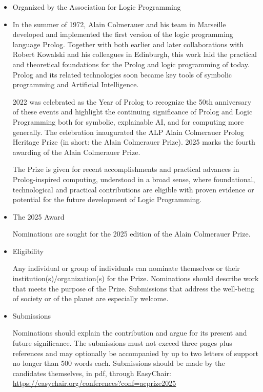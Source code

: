 \documentclass[prodmode,acmtecs]{acmsmall} %
\begin{document}
\begin{itemize}\item  Organized by the Association for Logic Programming 
 
\item  In the summer of 1972, Alain Colmerauer and his team in Marseille developed and implemented the first version of the logic programming language Prolog. Together with both earlier and later collaborations with Robert Kowalski and his colleagues in Edinburgh, this work laid the practical and theoretical foundations for the Prolog and logic programming of today. Prolog and its related technologies soon became key tools of symbolic programming and Artificial Intelligence. 
 
  2022 was celebrated as the Year of Prolog to recognize the 50th anniversary of these events and highlight the continuing significance of Prolog and Logic Programming both for symbolic, explainable AI, and for computing more generally. The celebration inaugurated the ALP Alain Colmerauer Prolog Heritage Prize (in short: the Alain Colmerauer Prize). 2025 marks the fourth awarding of the Alain Colmerauer Prize. 
 
  The Prize is given for recent accomplishments and practical advances in Prolog-inspired computing, understood in a broad sense, where foundational, technological and practical contributions are eligible with proven evidence or potential for the future development of Logic Programming. 
 
\item  The 2025 Award 
 
  Nominations are sought for the 2025 edition of the Alain Colmerauer Prize. 
 
\item  Eligibility 
 
  Any individual or group of individuals can nominate themselves or their institution(s)/organization(s) for the Prize. Nominations should describe work that meets the purpose of the Prize. Submissions that address the well-being of society or of the planet are especially welcome. 
 
\item  Submissions 
 
  Nominations should explain the contribution and argue for its present and future significance. The submissions must not exceed three pages plus references and may optionally be accompanied by up to two letters of support no longer than 500 words each. Submissions should be made by the candidates themselves, in pdf, through EasyChair: \href{https://easychair.org/conferences?conf=acprize2025}{https://easychair.org/conferences?conf=acprize2025} 
 

\end{itemize}
\end{document}
